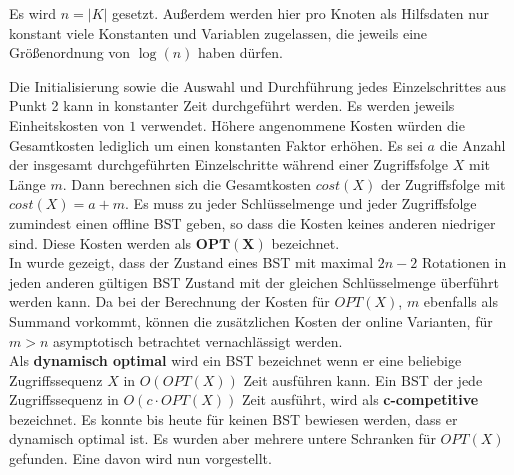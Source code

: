 \documentclass[a4paper,12pt]{article}
\begin{document}
 
 \noindent  Es wird $n = \vert K \vert$ gesetzt. Außerdem werden hier pro Knoten als Hilfsdaten nur konstant viele Konstanten und Variablen zugelassen, die jeweils eine Größenordnung von $\log \left(n\right)$  haben dürfen.
 
 \noindent Die Initialisierung sowie die Auswahl und Durchführung jedes Einzelschrittes aus Punkt 2 kann in konstanter Zeit durchgeführt werden. Es werden jeweils Einheitskosten von $1$ verwendet. Höhere angenommene Kosten würden die Gesamtkosten lediglich um einen konstanten Faktor erhöhen. Es sei $a$ die Anzahl der insgesamt durchgeführten Einzelschritte während einer Zugriffsfolge $X$ mit Länge $m$. Dann berechnen sich die Gesamtkosten $\mathit{cost(X)}$ der Zugriffsfolge mit $\mathit{cost(X)} = a + m$. Es muss zu jeder Schlüsselmenge und jeder Zugriffsfolge zumindest einen offline BST geben, so dass die Kosten keines anderen niedriger sind. Diese Kosten werden als $\mathbf{OPT\left(X\right)}$ bezeichnet.\\  In \cite{nRotations} wurde gezeigt, dass der Zustand eines BST mit maximal $2n -2$ Rotationen in jeden anderen gültigen BST Zustand mit der gleichen Schlüsselmenge überführt werden kann. Da bei der Berechnung der Kosten für  $\mathit{OPT(X)}$, $m$ ebenfalls als Summand vorkommt, können die zusätzlichen Kosten der online Varianten, für $m > n$ asymptotisch betrachtet vernachlässigt werden. \\
 \noindent Als \textbf{dynamisch optimal } wird ein BST bezeichnet wenn er eine beliebige Zugriffssequenz $X$ in $O\left(\mathit{OPT}\left(X\right)\right)$ Zeit ausführen kann. Ein BST der jede Zugriffssequenz in $O\left(c \cdot \mathit{OPT}\left(X\right)\right)$ Zeit ausführt, wird als \textbf{c-competitive} bezeichnet. Es konnte bis heute für keinen BST bewiesen werden, dass er dynamisch optimal ist. Es wurden aber mehrere untere Schranken für $\mathit{OPT}\left(X\right)$ gefunden. Eine davon wird  nun vorgestellt.
\end{document}
